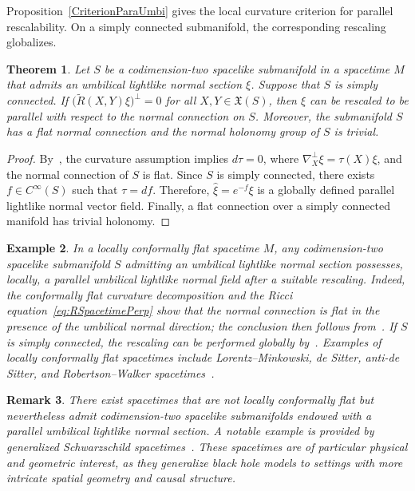\documentclass[11pt]{article}
\numberwithin{equation}{section}
\newtheorem{theorem}{Theorem}[section]
\newtheorem{remark}[theorem]{Remark}
\newtheorem{example}[theorem]{Example}
\begin{document}
	Proposition~\ref{CriterionParaUmbi} gives the local curvature criterion for parallel rescalability. On a simply connected submanifold, the corresponding rescaling globalizes.

\begin{theorem}\label{PUS}
	Let $S$ be a codimension-two spacelike submanifold in a spacetime $M$ that admits an umbilical lightlike normal section $\xi$. Suppose that $S$ is simply connected. If $\bigl(\widetilde R(X,Y)\xi\bigr)^\perp=0$ for all $X,Y\in\mathfrak X(S)$, then $\xi$ can be rescaled to be parallel with respect to the normal connection on $S$. Moreover, the submanifold $S$ has a flat normal connection and the normal holonomy group of $S$ is trivial.
\end{theorem}

\begin{proof}
	By~, the curvature assumption implies $d\tau=0$, where $\nabla_X^\perp\xi=\tau(X)\xi$, and the normal connection of $S$ is flat. Since $S$ is simply connected, there exists $f\in C^\infty(S)$ such that $\tau=df$. Therefore, $\widehat\xi=e^{-f}\xi$ is a globally defined parallel lightlike normal vector field. Finally, a flat connection over a simply connected manifold has trivial holonomy.
\end{proof}
\begin{example}
	\normalfont
	In a locally conformally flat spacetime $M$, any codimension-two spacelike submanifold $S$ admitting an umbilical lightlike normal section possesses, \emph{locally}, a parallel umbilical lightlike normal field after a suitable rescaling. Indeed, the conformally flat curvature decomposition and the Ricci equation~\eqref{eq:RSpacetimePerp} show that the normal connection is flat in the presence of the umbilical normal direction; the conclusion then follows from~. If $S$ is simply connected, the rescaling can be performed globally by~. Examples of locally conformally flat spacetimes include Lorentz--Minkowski, de Sitter, anti-de Sitter, and Robertson--Walker spacetimes~\cite{HawkingEllis,Wald}.
\end{example}

\begin{remark}\normalfont
	There exist spacetimes that are not locally conformally flat but nevertheless admit codimension-two spacelike submanifolds endowed with a parallel umbilical lightlike normal section. A notable example is provided by generalized Schwarzschild spacetimes~\cite{moron-palomo24}. These spacetimes are of particular physical and geometric interest, as they generalize black hole models to settings with more intricate spatial geometry and causal structure.
\end{remark}
\end{document}
